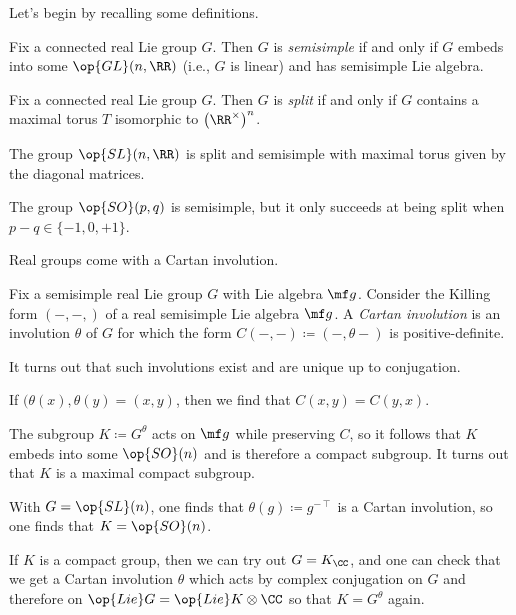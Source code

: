 \documentclass[../notes.tex]{subfiles}
\begin{document}
Let's begin by recalling some definitions.
\begin{definition}[semisimple]
	Fix a connected real Lie group $G$. Then $G$ is \textit{semisimple} if and only if $G$ embeds into some $\op{GL}(n,\RR)$ (i.e., $G$ is linear) and has semisimple Lie algebra.
\end{definition}
\begin{definition}[split]
	Fix a connected real Lie group $G$. Then $G$ is \textit{split} if and only if $G$ contains a maximal torus $T$ isomorphic to $\left(\RR^\times\right)^n$.
\end{definition}
\begin{example}
	The group $\op{SL}(n,\RR)$ is split and semisimple with maximal torus given by the diagonal matrices.
\end{example}
\begin{example}
	The group $\op{SO}(p,q)$ is semisimple, but it only succeeds at being split when $p-q\in\{-1,0,+1\}$.
\end{example}
Real groups come with a Cartan involution.
\begin{definition}
	Fix a semisimple real Lie group $G$ with Lie algebra $\mf g$. Consider the Killing form $(-,-,)$ of a real semisimple Lie algebra $\mf g$. A \textit{Cartan involution} is an involution $\theta$ of $G$ for which the form $C(-,-)\coloneqq(-,\theta-)$ is positive-definite.
\end{definition}
\begin{remark}
	It turns out that such involutions exist and are unique up to conjugation.
\end{remark}
\begin{remark}
	If $(\theta(x),\theta(y)=(x,y)$, then we find that $C(x,y)=C(y,x)$.
\end{remark}
\begin{remark}
	The subgroup $K\coloneqq G^\theta$ acts on $\mf g$ while preserving $C$, so it follows that $K$ embeds into some $\op{SO}(n)$ and is therefore a compact subgroup. It turns out that $K$ is a maximal compact subgroup.
\end{remark}
\begin{example}
	With $G=\op{SL}(n)$, one finds that $\theta(g)\coloneqq g^{-\intercal}$ is a Cartan involution, so one finds that $K=\op{SO}(n)$.
\end{example}
\begin{example}
	If $K$ is a compact group, then we can try out $G=K_\CC$, and one can check that we get a Cartan involution $\theta$ which acts by complex conjugation on $G$ and therefore on $\op{Lie}G=\op{Lie}K\otimes\CC$ so that $K=G^\theta$ again.
\end{example}
\end{document}
